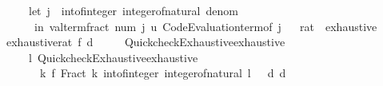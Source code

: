 \begin{isabellebody}
\ \ \ \ \ \ {\isacharparenleft}{\kern0pt}let\ j\ {\isacharequal}{\kern0pt}\ int{\isacharunderscore}{\kern0pt}of{\isacharunderscore}{\kern0pt}integer\ {\isacharparenleft}{\kern0pt}integer{\isacharunderscore}{\kern0pt}of{\isacharunderscore}{\kern0pt}natural\ {\isacharparenleft}{\kern0pt}denom\ {\isacharplus}{\kern0pt}\ {}{\isacharparenright}{\kern0pt}{\isacharparenright}{\kern0pt}\isanewline
\ \ \ \ \ \ \ in\ valterm{\isacharunderscore}{\kern0pt}fract\ num\ {\isacharparenleft}{\kern0pt}j{\isacharcomma}{\kern0pt}\ {\isasymlambda}u{\isachardot}{\kern0pt}\ Code{\isacharunderscore}{\kern0pt}Evaluation{\isachardot}{\kern0pt}term{\isacharunderscore}{\kern0pt}of\ j{\isacharparenright}{\kern0pt}{\isacharparenright}{\kern0pt}{\isacharparenright}{\kern0pt}{\isacharparenright}{\kern0pt}{\isachardoublequoteclose}\isanewline
\isanewline
{}\isamarkupfalse%
%
\isadelimproof
\ %
\endisadelimproof
%
\isatagproof
\isacommand{{\isachardot}{\kern0pt}{\isachardot}{\kern0pt}}\isamarkupfalse%
%
\endisatagproof
{\isafoldproof}%
%
\isadelimproof
%
\endisadelimproof
\isanewline
\isanewline
{}\isamarkupfalse%
\isanewline
\isanewline
{}\isamarkupfalse%
\isanewline
\isanewline
{}\isamarkupfalse%
\ rat\ {\isacharcolon}{\kern0pt}{\isacharcolon}{\kern0pt}\ exhaustive\isanewline
{}\isanewline
\isanewline
{}\isamarkupfalse%
\isanewline
\ \ {\isachardoublequoteopen}exhaustive{\isacharunderscore}{\kern0pt}rat\ f\ d\ {\isacharequal}{\kern0pt}\isanewline
\ \ \ \ Quickcheck{\isacharunderscore}{\kern0pt}Exhaustive{\isachardot}{\kern0pt}exhaustive\isanewline
\ \ \ \ \ \ {\isacharparenleft}{\kern0pt}{\isasymlambda}l{\isachardot}{\kern0pt}\ Quickcheck{\isacharunderscore}{\kern0pt}Exhaustive{\isachardot}{\kern0pt}exhaustive\isanewline
\ \ \ \ \ \ \ \ {\isacharparenleft}{\kern0pt}{\isasymlambda}k{\isachardot}{\kern0pt}\ f\ {\isacharparenleft}{\kern0pt}Fract\ k\ {\isacharparenleft}{\kern0pt}int{\isacharunderscore}{\kern0pt}of{\isacharunderscore}{\kern0pt}integer\ {\isacharparenleft}{\kern0pt}integer{\isacharunderscore}{\kern0pt}of{\isacharunderscore}{\kern0pt}natural\ l{\isacharparenright}{\kern0pt}\ {\isacharplus}{\kern0pt}\ {}{\isacharparenright}{\kern0pt}{\isacharparenright}{\kern0pt}{\isacharparenright}{\kern0pt}\ d{\isacharparenright}{\kern0pt}\ d{\isachardoublequoteclose}\isanewline
\isanewline
{}\isamarkupfalse%
%
\isadelimproof
\ %
\endisadelimproof
%
\isatagproof
\isacommand{{\isachardot}{\kern0pt}{\isachardot}{\kern0pt}}\isamarkupfalse%
%
\endisatagproof

\end{isabellebody}
